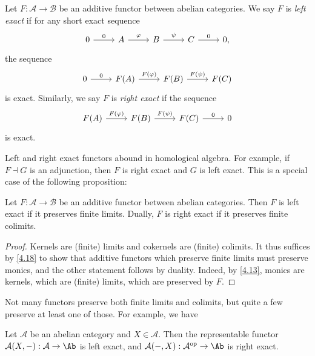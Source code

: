 \begin{definition}\label{7.4}
	Let $F : \mathcal{A}  \to \mathcal{B} $ be an additive functor between abelian categories. We say $F$ is \emph{left exact} if for any short exact sequence
	\[\begin{tikzcd}[row sep = 2.5em, column sep = 2.5em]
	0\ar[" 0 ", r]  & A\ar[" \varphi  ", r]  & B \ar[" \psi  ", r]  & C\ar[" 0 ",r]  & 0,
	\end{tikzcd}\]
	the sequence
	\[\begin{tikzcd}[row sep = 2.5em, column sep = 2.5em]
	0\ar[" 0 ", r]  & F(A)\ar[" F(\varphi ) ", r]  & F(B)\ar[" F(\psi ) ", r]  & F(C)
	\end{tikzcd}\]
	is exact. Similarly, we say $F$ is \emph{right exact} if the sequence
	\[\begin{tikzcd}[row sep = 2.5em, column sep = 2.5em]
	F(A)\ar[" F(\varphi ) ", r]  & F(B)\ar[" F(\psi ) ", r]  & F(C)\ar[" 0 ", r]  & 0
	\end{tikzcd}\]
	is exact.
\end{definition}

Left and right exact functors abound in homological algebra. For example, if $F\dashv G$ is an adjunction, then $F$ is right exact and $G$ is left exact. This is a special case of the following proposition:

\begin{proposition}\label{7.6}
	Let $F : \mathcal{A}  \to \mathcal{B} $ be an additive functor between abelian categories. Then $F$ is left exact if it preserves finite limits. Dually, $F$ is right exact if it preserves finite colimits.
\end{proposition}
\begin{proof}
	Kernels are (finite) limits and cokernels are (finite) colimits. It thus suffices by \cref{4.18} to show that additive functors which preserve finite limits must preserve monics, and the other statement follows by duality. Indeed, by \cref{4.13}, monics are kernels, which are (finite) limits, which are preserved by $F$.
\end{proof}

Not many functors preserve both finite limits and colimits, but quite a few preserve at least one of those. For example, we have

\begin{corollary}\label{7.7}
	Let $\mathcal{A} $ be an abelian category and $X\in \mathcal{A} $. Then the representable functor $\mathcal{A} (X,-): \mathcal{A}  \to \Ab $ is left exact, and $\mathcal{A} (-,X): \mathcal{A} ^{\mathrm{op}}  \to \Ab $ is right exact.
\end{corollary}


